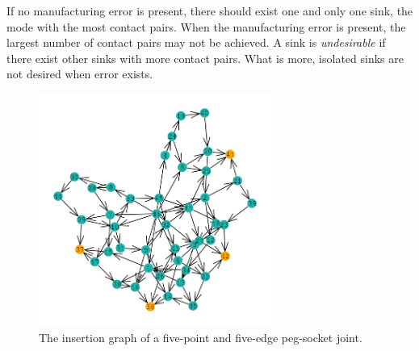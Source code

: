 \documentclass[letterpaper, 10 pt, conference]{ieeeconf}
\begin{document}
If no manufacturing error is present, there should exist one and only one sink, the mode with the most contact pairs. When the manufacturing error is present, the largest number of contact pairs may not be achieved. A sink is {\em undesirable} if there exist other sinks with more contact pairs. What is more, isolated sinks are not desired when error exists. 


\begin{figure}
\begin{center}
\includegraphics[width=3in]{figures/insertion_graph.png}
\end{center}
\caption{The insertion graph of a five-point and five-edge peg-socket joint. }
\label{fig:insertion_graph}
\end{figure}
\end{document}
